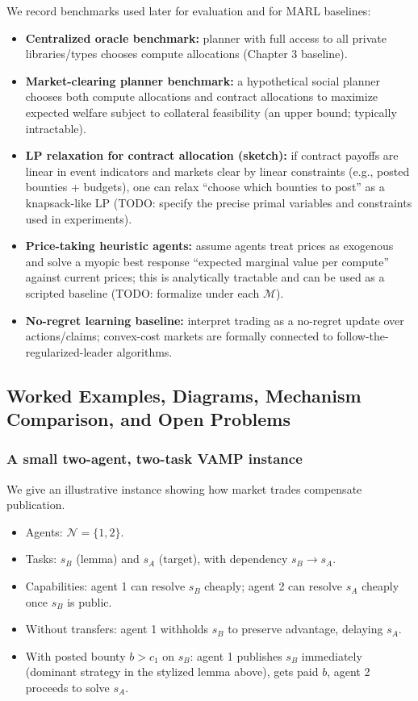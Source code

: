 We record benchmarks used later for evaluation and for MARL baselines:
\begin{itemize}
\item \textbf{Centralized oracle benchmark:} planner with full access to all private libraries/types chooses compute allocations (Chapter 3 baseline).
\item \textbf{Market-clearing planner benchmark:} a hypothetical social planner chooses both compute allocations and contract allocations to maximize expected welfare subject to collateral feasibility (an upper bound; typically intractable).
\item \textbf{LP relaxation for contract allocation (sketch):} if contract payoffs are linear in event indicators and markets clear by linear constraints (e.g., posted bounties + budgets), one can relax ``choose which bounties to post'' as a knapsack-like LP (TODO: specify the precise primal variables and constraints used in experiments).
\item \textbf{Price-taking heuristic agents:} assume agents treat prices as exogenous and solve a myopic best response ``expected marginal value per compute'' against current prices; this is analytically tractable and can be used as a scripted baseline (TODO: formalize under each \(\mathcal{M}\)).
\item \textbf{No-regret learning baseline:} interpret trading as a no-regret update over actions/claims; convex-cost markets are formally connected to follow-the-regularized-leader algorithms.
\end{itemize}

\subsection{Worked Examples, Diagrams, Mechanism Comparison, and Open Problems}

\subsubsection{A small two-agent, two-task VAMP instance}

We give an illustrative instance showing how market trades compensate publication.
\begin{itemize}
\item Agents: \(\mathcal{N}=\{1,2\}\).
\item Tasks: \(s_B\) (lemma) and \(s_A\) (target), with dependency \(s_B\to s_A\).
\item Capabilities: agent 1 can resolve \(s_B\) cheaply; agent 2 can resolve \(s_A\) cheaply once \(s_B\) is public.
\item Without transfers: agent 1 withholds \(s_B\) to preserve advantage, delaying \(s_A\).
\item With posted bounty \(b>c_1\) on \(s_B\): agent 1 publishes \(s_B\) immediately (dominant strategy in the stylized lemma above), gets paid \(b\), agent 2 proceeds to solve \(s_A\).
\end{itemize}

